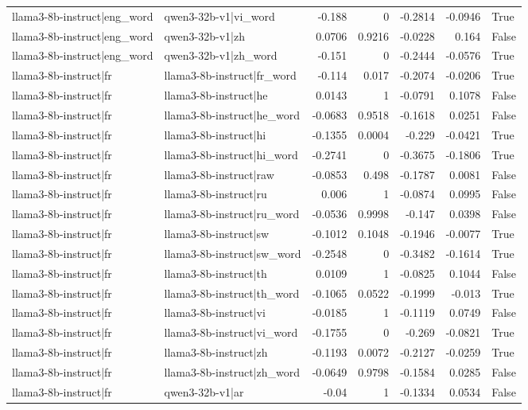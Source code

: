 \begin{table}
\begin{tabular}{l l r r r r l}
llama3-8b-instruct|eng_word & qwen3-32b-v1|vi_word & -0.188 & 0 & -0.2814 & -0.0946 & True \\
llama3-8b-instruct|eng_word & qwen3-32b-v1|zh & 0.0706 & 0.9216 & -0.0228 & 0.164 & False \\
llama3-8b-instruct|eng_word & qwen3-32b-v1|zh_word & -0.151 & 0 & -0.2444 & -0.0576 & True \\
llama3-8b-instruct|fr & llama3-8b-instruct|fr_word & -0.114 & 0.017 & -0.2074 & -0.0206 & True \\
llama3-8b-instruct|fr & llama3-8b-instruct|he & 0.0143 & 1 & -0.0791 & 0.1078 & False \\
llama3-8b-instruct|fr & llama3-8b-instruct|he_word & -0.0683 & 0.9518 & -0.1618 & 0.0251 & False \\
llama3-8b-instruct|fr & llama3-8b-instruct|hi & -0.1355 & 0.0004 & -0.229 & -0.0421 & True \\
llama3-8b-instruct|fr & llama3-8b-instruct|hi_word & -0.2741 & 0 & -0.3675 & -0.1806 & True \\
llama3-8b-instruct|fr & llama3-8b-instruct|raw & -0.0853 & 0.498 & -0.1787 & 0.0081 & False \\
llama3-8b-instruct|fr & llama3-8b-instruct|ru & 0.006 & 1 & -0.0874 & 0.0995 & False \\
llama3-8b-instruct|fr & llama3-8b-instruct|ru_word & -0.0536 & 0.9998 & -0.147 & 0.0398 & False \\
llama3-8b-instruct|fr & llama3-8b-instruct|sw & -0.1012 & 0.1048 & -0.1946 & -0.0077 & True \\
llama3-8b-instruct|fr & llama3-8b-instruct|sw_word & -0.2548 & 0 & -0.3482 & -0.1614 & True \\
llama3-8b-instruct|fr & llama3-8b-instruct|th & 0.0109 & 1 & -0.0825 & 0.1044 & False \\
llama3-8b-instruct|fr & llama3-8b-instruct|th_word & -0.1065 & 0.0522 & -0.1999 & -0.013 & True \\
llama3-8b-instruct|fr & llama3-8b-instruct|vi & -0.0185 & 1 & -0.1119 & 0.0749 & False \\
llama3-8b-instruct|fr & llama3-8b-instruct|vi_word & -0.1755 & 0 & -0.269 & -0.0821 & True \\
llama3-8b-instruct|fr & llama3-8b-instruct|zh & -0.1193 & 0.0072 & -0.2127 & -0.0259 & True \\
llama3-8b-instruct|fr & llama3-8b-instruct|zh_word & -0.0649 & 0.9798 & -0.1584 & 0.0285 & False \\
llama3-8b-instruct|fr & qwen3-32b-v1|ar & -0.04 & 1 & -0.1334 & 0.0534 & False \\

\end{tabular}
\end{table}
